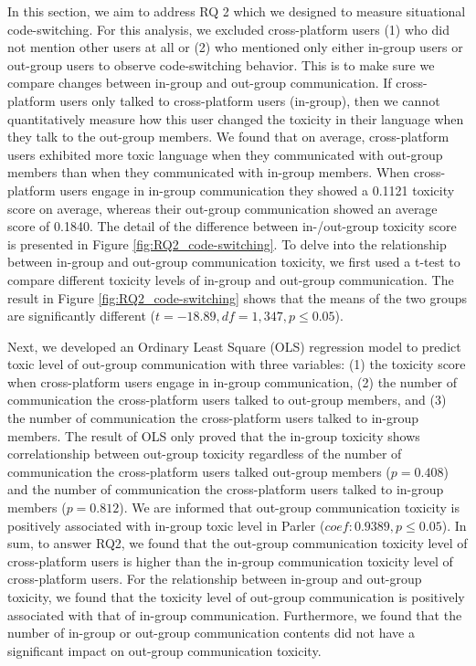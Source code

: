 \documentclass[Crown,sagev,times]{sagej}
\begin{document}
In this section, we aim to address RQ 2 which we designed to measure situational code-switching.
For this analysis, we excluded cross-platform users (1) who did not mention other users at all 
or (2) who mentioned only either in-group users or out-group users to observe code-switching behavior. 
This is to make sure we compare changes between in-group and out-group communication. 
If cross-platform users only talked to cross-platform users (in-group), then we cannot quantitatively measure 
how this user changed the toxicity in their language when they talk to the out-group members.
We found that on average, cross-platform users exhibited more toxic language when they communicated 
with out-group members than when they communicated with in-group members. 
When cross-platform users engage in in-group communication they showed a 0.1121 toxicity score on average, 
whereas their out-group communication showed an average score of 0.1840. 
The detail of the difference between in-/out-group toxicity score is presented in Figure \ref{fig:RQ2_code-switching}. 
To delve into the relationship between in-group and out-group communication toxicity, 
we first used a t-test to compare different toxicity levels of in-group and out-group communication. 
The result in Figure \ref{fig:RQ2_code-switching} shows that the means of the two groups 
are significantly different ($t = -18.89, df = 1,347, p \leq 0.05$). 

Next, we developed an Ordinary Least Square (OLS) regression model to predict toxic level of out-group communication with three variables: (1) the toxicity score when cross-platform users engage in in-group communication, (2) the number of communication the cross-platform users talked to out-group members, and (3) the number of communication the cross-platform users talked to in-group members. The result of OLS only proved that the in-group toxicity shows correlationship between out-group toxicity regardless of the number of communication the cross-platform users talked out-group members ($p=0.408$) and the number of communication the cross-platform users talked to in-group members ($p=0.812$). We are informed that out-group communication toxicity is positively associated with in-group toxic level in Parler ($coef: 0.9389, p \leq 0.05$). 
In sum, to answer RQ2, we found that the out-group communication toxicity level of cross-platform users is higher than the in-group communication toxicity level of cross-platform users. For the relationship between in-group and out-group toxicity, we found that the toxicity level of out-group communication is positively associated with that of in-group communication. Furthermore, we found that the number of in-group or out-group communication contents did not have a significant impact on out-group communication toxicity.
\end{document}
